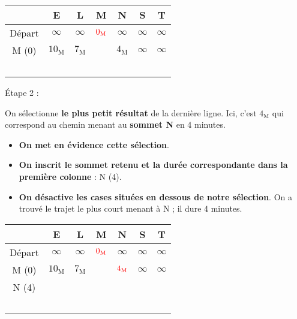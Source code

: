 \begin{center}
     \begin{extern}
          \begin{tabularx}{0.9\linewidth}{|c|C|C|C|C|C|C|}
               \hline
               \			&  E 						& L							& M							& N 							& S								& T  						\\ \hline
               Départ			&  $\infty$	 				& $\infty$					&  $\color{red}0_{\text{M}}$	& $\infty$					& $\infty$						& $\infty$	  				\\ \hline
               M (0) 			&  $10_{\text{M}}$	 		& $7_{\text{M}}$	 			& 		& $4_{\text{M}}$	& $\infty$						& $\infty$ 					\\ \hline
               \ 				&  \ 						& \ 							& 		& \ 							& \ 								& \ 											\\
          \end{tabularx}
     \end{extern}
\end{center}
\begin{h2}\'Etape 2 :\end{h2}
On sélectionne \textbf{le plus petit résultat} de la dernière ligne. Ici, c'est \og $4_{\text{M}}$ \fg{} qui correspond au chemin menant au \textbf{sommet N} en 4 minutes.
\begin{itemize}
     \item \textbf{On met en évidence cette sélection}.
     \item \textbf{On inscrit le sommet retenu et la durée correspondante dans la première colonne} : N (4).
     \item \textbf{On désactive les cases situées en dessous de notre sélection}. On a trouvé le trajet le plus court menant à N ; il dure 4 minutes.
\end{itemize}
\begin{center}
     \begin{extern}
          \begin{tabularx}{0.9\linewidth}{|c|C|C|C|C|C|C|}
               \hline
               \			&  E 						& L							& M							& N 							& S								& T  						\\ \hline
               Départ			&  $\infty$	 				& $\infty$					& $\color{red}0_{\text{M}}$	& $\infty$					& $\infty$						& $\infty$	  				\\ \hline
               M (0) 			&  $10_{\text{M}}$	 		& $7_{\text{M}}$	 			& 		& $\color{red}4_{\text{M}}$	& $\infty$						& $\infty$ 					\\ \hline
               N (4)			&  \ 						& \ 							& \cellcolor{black!20}		& \ 							& \ 								& \ 											\\ \hline
               \ 				&  \ 						& \ 							& 		& 	 							& \
          \end{tabularx}
     \end{extern}
\end{center}
